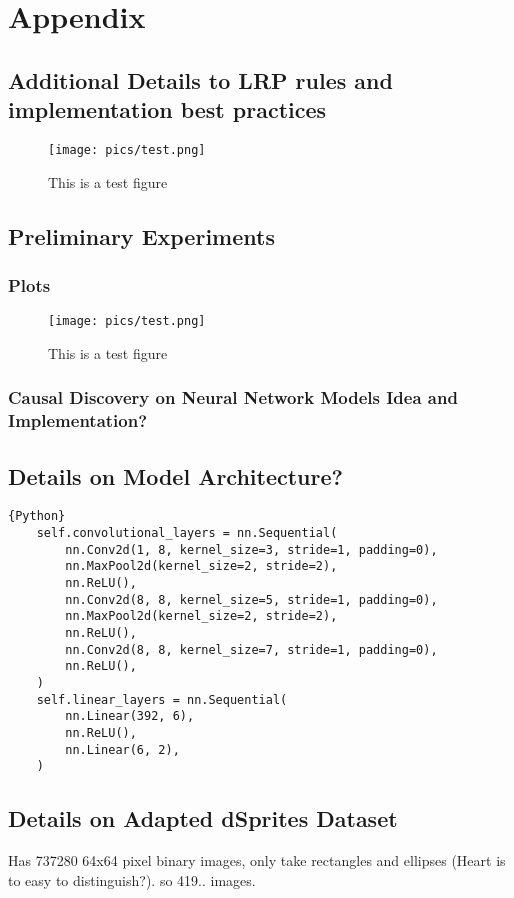 \chapter{Appendix}\label{chapter:Appendix}


\section{Additional Details to LRP rules and implementation best practices}
\label{appendix:lrprules}
\begin{figure}[ht]
	\centering
	\label{fig:tesfigure}
	\texttt{[image: pics/test.png]}
	\caption[Test Figure]{This is a test figure}
\end{figure}

\section{Preliminary Experiments}
\subsection{Plots}
\begin{figure}[ht]
	\centering
	\label{fig:blafigure}
	\texttt{[image: pics/test.png]}
	\caption[Test Figure 2]{This is a test figure}
\end{figure}
\subsection{Causal Discovery on Neural Network Models Idea and Implementation?}


\section{Details on Model Architecture?}

\begin{lstlisting}{Python}
	self.convolutional_layers = nn.Sequential(
		nn.Conv2d(1, 8, kernel_size=3, stride=1, padding=0),
		nn.MaxPool2d(kernel_size=2, stride=2),
		nn.ReLU(),
		nn.Conv2d(8, 8, kernel_size=5, stride=1, padding=0),
		nn.MaxPool2d(kernel_size=2, stride=2),
		nn.ReLU(),
		nn.Conv2d(8, 8, kernel_size=7, stride=1, padding=0),
		nn.ReLU(),
	)
	self.linear_layers = nn.Sequential(
		nn.Linear(392, 6),
		nn.ReLU(),
		nn.Linear(6, 2),
	)
\end{lstlisting}

\section{Details on Adapted dSprites Dataset}\label{appendix:dsprites}
Has 737280 64x64 pixel binary images, only take rectangles and ellipses (Heart is to easy to distinguish?). so 419.. images.

